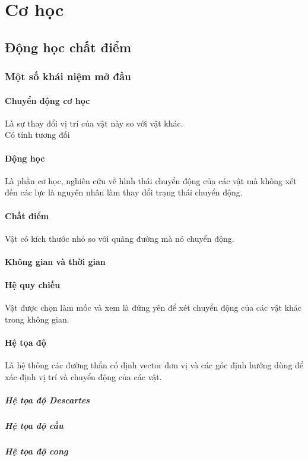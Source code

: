 \part{Cơ học}
\chapter{Động học chất điểm}
\section{Một số khái niệm mở đầu}
\subsection{Chuyển động cơ học}
Là sự thay đổi vị trí của vật này so với vật khác.\\
Có tính tương đối
\subsection{Động học}
Là phần cơ học, nghiên cứu về hình thái chuyển động của các vật mà không xét đến các lực là nguyên nhân làm thay đổi trạng thái chuyển động.
\subsection{Chất điểm}
Vật có kích thước nhỏ so với quãng đường mà nó chuyển động.
\subsection{Không gian và thời gian}
\subsection{Hệ quy chiếu}
Vật được chọn làm mốc và xem là đứng yên để xét chuyển động của các vật khác trong không gian.
\subsection{Hệ tọa độ}
Là hệ thống các đường thẳn có định vector đơn vị và các góc định hướng dùng để xác định vị trí và chuyển động của các vật.
\subsubsection{Hệ tọa độ Descartes}
\subsubsection{Hệ tọa độ cầu}
\subsubsection{Hệ tọa độ cong}
